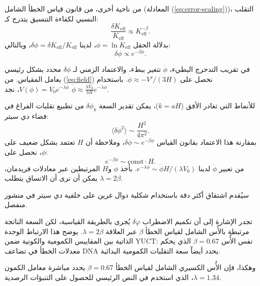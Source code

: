 \documentclass[12pt,a4paper]{article}
\newcommand{\Keff}{K_{\mathrm{eff}}}
\begin{document}
	من ناحية أخرى، من قانون قياس الخطأ الشامل (المعادلة (\ref{eq:error-scaling}))، التقلب النسبي لكفاءة التنسيق يتدرج كـ:
	\begin{equation}
		\frac{\delta\Keff}{\Keff} \propto \Keff^{-\beta}.
	\end{equation}
	بدلالة الحقل \(\phi = \ln\Keff\)، لدينا \(\delta\phi = \delta\Keff/\Keff\)، وبالتالي:
	\begin{equation}
		\delta\phi \propto e^{-\beta\phi}.
	\end{equation}
	
	في تقريب التدحرج البطيء، \(\dot{\phi}\) تتغير ببطء، والاعتماد الزمني لـ \(\delta\phi\) محدد بشكل رئيسي بعامل المقياس. من (\ref{eq:field}) نحصل على \(\dot{\phi} \approx -V'/(3H)\). باستخدام \(V(\phi) = V_0 e^{-\lambda\phi}\)، نجد \(\dot{\phi} \approx \frac{\lambda V_0}{3H} e^{-\lambda\phi}\).
	
	للأنماط التي تغادر الأفق (\(k = aH\))، يمكن تقدير السعة \(\delta\phi_k\) من تطبيع تقلبات الفراغ في فضاء دي سيتر:
	\begin{equation}
		\langle \delta\phi^2 \rangle \sim \frac{H^2}{4\pi^2}.
	\end{equation}
	بمقارنة هذا الاعتماد بقانون القياس \(\delta\phi \sim e^{-\beta\phi}\)، وملاحظة أن \(H\) تعتمد بشكل ضعيف على \(\phi\)، نحصل على:
	\begin{equation}
		e^{-\beta\phi} \sim \text{const} \cdot H.
	\end{equation}
	من تعبير \(\dot{\phi}\) لدينا \(e^{-\lambda\phi} \sim \dot{\phi} H / (\lambda V_0)\). بأخذ \(\dot{\phi}\) و\(H\) المرتبطين عبر معادلات فريدمان، يمكن أن نرى أن الاتساق يتطلب \(\lambda = 2\beta\).
	
	سيُقدم اشتقاق أكثر دقة باستخدام شكلية دوال غرين على خلفية دي سيتر في منشور منفصل.
	
	تجدر الإشارة إلى أن تكميم الاضطراب \(\delta\varphi\) يُجرى بالطريقة القياسية، لكن السعة الناتجة مرتبطة بالأُس الشامل لقياس الخطأ \(\beta\) عبر العلاقة \(\lambda = 2\beta\). يوضح هذا الارتباط الوحدة الذاتية بين المقاييس الكمومية والكونية ضمن YUCT: نفس الأُس \(\beta = 0.67\) الذي يحكم معدلات الخطأ في تضاعف DNA يحدد أيضاً سعة التقلبات الكمومية البدائية.
	
	وهكذا، فإن الأُس الكسيري الشامل لقياس الخطأ \(\beta = 0.67\) يحدد مباشرة معامل الكمون \(\lambda = 1.34\)، الذي استخدم في النص الرئيسي للحصول على التنبؤات الرصدية.
	
\end{document}
